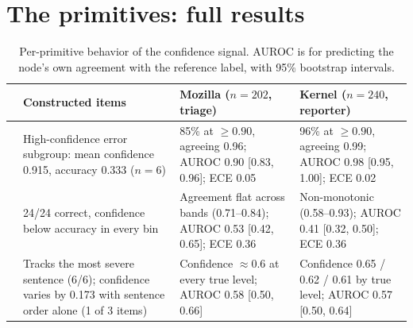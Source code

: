 \section{The primitives: full results}
\label{app:primitives}
\begin{table}[t]
\centering
\caption{Per-primitive behavior of the confidence signal. AUROC is for
predicting the node's own agreement with the reference label, with 95\% bootstrap intervals.}
\label{tab:char}

\small
\begin{tabularx}{\linewidth}{l Y Y Y}
\toprule
 & Constructed items & Mozilla ($n{=}202$, triage) & Kernel ($n{=}240$, reporter) \\
\midrule
\choice{} & High-confidence error subgroup: mean confidence 0.915, accuracy 0.333 ($n{=}6$)
 & 85\% at $\geq0.90$, agreeing 0.96; AUROC 0.90 [0.83, 0.96]; ECE 0.05
 & 96\% at $\geq0.90$, agreeing 0.99; AUROC 0.98 [0.95, 1.00]; ECE 0.02 \\
\addlinespace
\noul{} & 24/24 correct, confidence below accuracy in every bin
 & Agreement flat across bands (0.71--0.84); AUROC 0.53 [0.42, 0.65]; ECE 0.36
 & Non-monotonic (0.58--0.93); AUROC 0.41 [0.32, 0.50]; ECE 0.36 \\
\addlinespace
\score{} & Tracks the most severe sentence (6/6); confidence varies by 0.173 with sentence order alone (1 of 3 items)
 & Confidence $\approx$0.6 at every true level; AUROC 0.58 [0.50, 0.66]
 & Confidence 0.65 / 0.62 / 0.61 by true level; AUROC 0.57 [0.50, 0.64] \\
\bottomrule
\end{tabularx}

\end{table}


